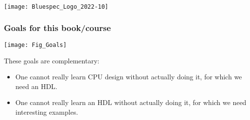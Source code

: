 



\date{L1: Introduction}





\begin{frame}
 \titlepage

 \begin{center}
  \texttt{[image: Bluespec\_Logo\_2022-10]}
 \end{center}
\end{frame}






\begin{frame}
\frametitle{Goals for this book/course}

\footnotesize

\begin{center}
 \texttt{[image: Fig\_Goals]}
\end{center}

These goals are complementary:
\begin{itemize}

 \item One cannot really learn CPU design without actually doing it,
       for which we need an HDL.

 \item One cannot really learn an HDL without actually doing it, for
       which we need interesting examples.

\end{itemize}

\end{frame}


